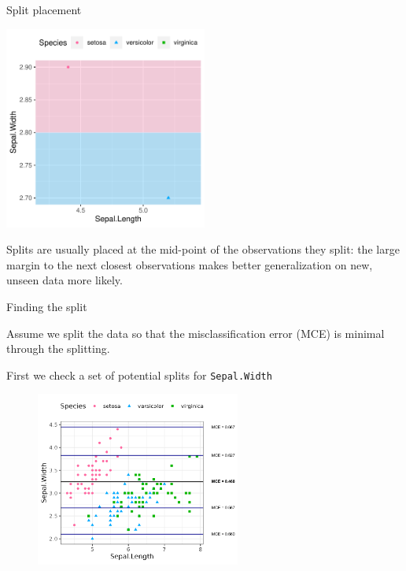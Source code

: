 \documentclass[11pt,compress,t,notes=noshow, xcolor=table]{beamer}
\begin{document}
\begin{vbframe}{Split placement}
\begin{knitrout}\scriptsize
{}\color{fgcolor}

{\centering \includegraphics[width=0.5\textwidth]{figure/split_point.pdf}

}



\end{knitrout}
\lz
Splits are usually placed at the mid-point of the observations they split: the large margin to the next closest observations makes better generalization on new, unseen data more likely.
\end{vbframe}

\begin{vbframe}{Finding the split}

Assume we split the data so that the misclassification error (MCE) is minimal through the splitting.

First we check a set of potential splits for \texttt{Sepal.Width}

\begin{figure}
\includegraphics[width=0.6\textwidth]{figure/treegrowing-y.pdf}
\end{figure}

\end{vbframe}
\end{document}
